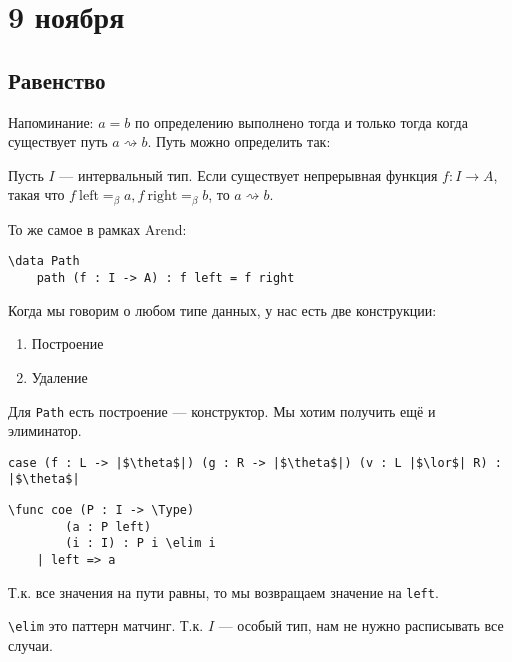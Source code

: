 \chapter{9 ноября}

\section{Равенство}

Напоминание: \(a = b\) по определению выполнено тогда и только тогда когда существует путь \(a \rightsquigarrow b\). Путь можно определить так:

\begin{definition}
    Пусть \(I\) --- интервальный тип. Если существует непрерывная функция \(f : I \to A\), такая что \(f\ \mathrm{left} =_\beta a, f\ \mathrm{right} =_\beta b\), то \(a \rightsquigarrow b\).
\end{definition}

То же самое в рамках Arend:
\begin{verbatim}
\data Path
    path (f : I -> A) : f left = f right
\end{verbatim}

Когда мы говорим о любом типе данных, у нас есть две конструкции:
\begin{enumerate}
    \item Построение
    \item Удаление
\end{enumerate}

Для \texttt{Path} есть построение --- конструктор. Мы хотим получить ещё и элиминатор.

\begin{example}\itemfix
    \begin{verbatim}
case (f : L -> |$\theta$|) (g : R -> |$\theta$|) (v : L |$\lor$| R) : |$\theta$|
    \end{verbatim}
\end{example}

\begin{example}\itemfix
    \begin{verbatim}
\func coe (P : I -> \Type)
        (a : P left)
        (i : I) : P i \elim i
    | left => a
            \end{verbatim}

    Т.к. все значения на пути равны, то мы возвращаем значение на \texttt{left}.

    \verb!\elim! это паттерн матчинг. Т.к. \(I\) --- особый тип, нам не нужно расписывать все случаи.
\end{example}

